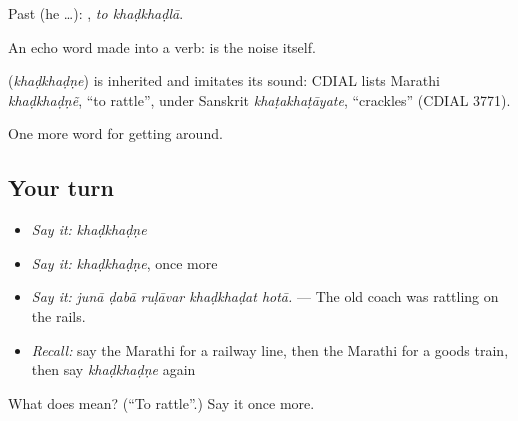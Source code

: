 Past (he …):  , \emph{to khaḍkhaḍlā}.

An echo word made into a verb:   is the noise itself.

\begin{cousinweb}
\textbf{} (\emph{khaḍkhaḍṇe}) is inherited and imitates its sound: CDIAL lists Marathi \emph{khaḍkhaḍṇẽ}, \textquotedblleft{}to rattle\textquotedblright{}, under Sanskrit \emph{khaṭakhaṭāyate}, \textquotedblleft{}crackles\textquotedblright{} (CDIAL 3771).
\end{cousinweb}

\begin{grammarlens}[title={What you've built}]
One more word for getting around.
\end{grammarlens}

\subsection*{Your turn}
\begin{itemize}
\raggedright
  \item \emph{Say it:} \emph{khaḍkhaḍṇe}
  \item \emph{Say it:} \emph{khaḍkhaḍṇe}, once more
  \item \emph{Say it:} \emph{junā ḍabā ruḷāvar khaḍkhaḍat hotā.} — The old coach was rattling on the rails.
  \item \emph{Recall:} say the Marathi for a railway line, then the Marathi for a goods train, then say \emph{khaḍkhaḍṇe} again
\end{itemize}

\begin{tcolorbox}[breakable,colback=teal!4,colframe=teal!35!black,title={Before you move on}]
What does  mean? (\textquotedblleft{}To rattle\textquotedblright{}.) Say it once more.
\end{tcolorbox}
